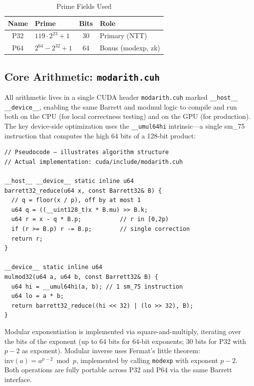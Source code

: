 \documentclass[conference]{IEEEtran}
\begin{document}
\begin{table}[t]
\caption{Prime Fields Used}
\label{tab:primes}
\begin{center}
\begin{tabular}{|c|l|c|l|}
\hline
\textbf{Name} & \textbf{Prime} & \textbf{Bits} & \textbf{Role} \\
\hline
P32 & $119 \cdot 2^{23}+1$ & 30 & Primary (NTT) \\
\hline
P64 & $2^{64}-2^{32}+1$ & 64 & Bonus (modexp, zk) \\
\hline
\end{tabular}
\end{center}
\end{table}

\subsection{Core Arithmetic: \texttt{modarith.cuh}}

All arithmetic lives in a single CUDA header \texttt{modarith.cuh} marked
\texttt{\_\_host\_\_ \_\_device\_\_}, enabling the same Barrett and modmul
logic to compile and run both on the CPU (for local correctness testing) and
on the GPU (for production). The key device-side optimization uses the
\texttt{\_\_umul64hi} intrinsic---a single sm\_75 instruction that computes
the high 64 bits of a 128-bit product:

\begin{lstlisting}
// Pseudocode — illustrates algorithm structure
// Actual implementation: cuda/include/modarith.cuh

__host__ __device__ static inline u64
barrett32_reduce(u64 x, const Barrett32& B) {
  // q = floor(x / p), off by at most 1
  u64 q = ((__uint128_t)x * B.mu) >> B.k;
  u64 r = x - q * B.p;           // r in [0,2p)
  if (r >= B.p) r -= B.p;        // single correction
  return r;
}

__device__ static inline u64
mulmod32(u64 a, u64 b, const Barrett32& B) {
  u64 hi = __umul64hi(a, b); // 1 sm_75 instruction
  u64 lo = a * b;
  return barrett32_reduce((hi << 32) | (lo >> 32), B);
}
\end{lstlisting}

Modular exponentiation is implemented via square-and-multiply, iterating
over the bits of the exponent (up to 64 bits for 64-bit exponents; 30 bits for
P32 with $p-2$ as exponent). Modular inverse uses Fermat's
little theorem: $\text{inv}(a) = a^{p-2} \bmod p$, implemented by calling
\texttt{modexp} with exponent $p-2$. Both operations are fully portable across
P32 and P64 via the same Barrett interface.
\end{document}
